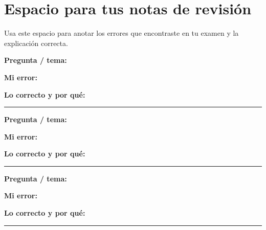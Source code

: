 \documentclass[12pt, oneside]{article}
\begin{document}
\section{Espacio para tus notas de revisión}

Usa este espacio para anotar los errores que encontraste en tu examen y
la explicación correcta.

\vspace{0.4cm}
\noindent\textbf{Pregunta / tema:} \hrulefill

\vspace{1.8cm}
\noindent\textbf{Mi error:} \hrulefill

\vspace{1.8cm}
\noindent\textbf{Lo correcto y por qué:}

\vspace{3cm}
\noindent\rule{\textwidth}{0.4pt}

\vspace{0.6cm}
\noindent\textbf{Pregunta / tema:} \hrulefill

\vspace{1.8cm}
\noindent\textbf{Mi error:} \hrulefill

\vspace{1.8cm}
\noindent\textbf{Lo correcto y por qué:}

\vspace{3cm}
\noindent\rule{\textwidth}{0.4pt}

\vspace{0.6cm}
\noindent\textbf{Pregunta / tema:} \hrulefill

\vspace{1.8cm}
\noindent\textbf{Mi error:} \hrulefill

\vspace{1.8cm}
\noindent\textbf{Lo correcto y por qué:}

\vspace{3cm}
\noindent\rule{\textwidth}{0.4pt}
\end{document}

